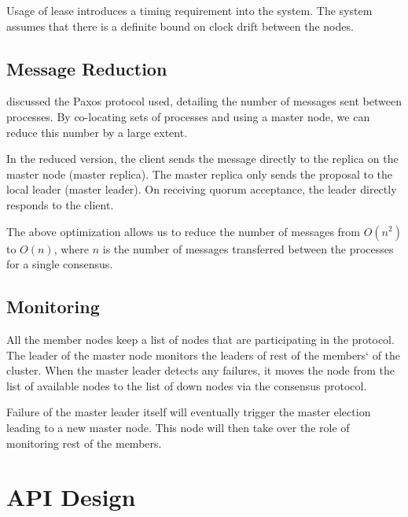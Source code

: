 Usage of lease introduces a timing requirement into the system. The system
assumes that there is a definite bound on clock drift%
between the nodes.

\subsection{Message Reduction}

 discussed the Paxos protocol used, detailing the number
of messages sent between processes. By co-locating sets of processes and
using a master node, we can reduce this number by a large extent.

In the reduced version, the client sends the message directly to the
replica on the master node (master replica). The master replica only
sends the proposal to the local leader (master leader). On receiving quorum
acceptance, the leader directly responds to the client.

The above optimization allows us to reduce the number of messages from
$O(n^2)$ to $O(n)$, where $n$ is the number of messages transferred between
the processes for a single consensus.

\subsection{Monitoring}

All the member nodes%
keep a list of nodes that are participating in the protocol.
The leader of the master node monitors the leaders of rest of the members`
of the cluster. When the master leader detects any failures, it moves the
node from the list of available nodes to the list of down nodes via the
consensus protocol.

Failure of the master leader itself will eventually trigger the master election
leading to a new master node. This node will then take over the role of
monitoring rest of the members.

\section{API Design}

